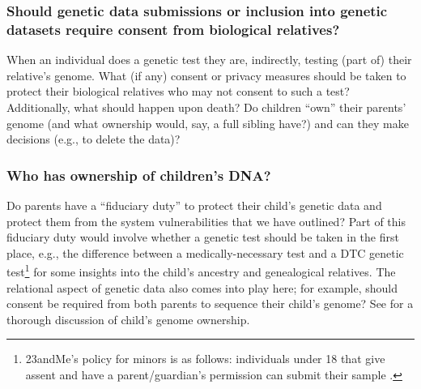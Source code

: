 \subsubsection{Should genetic data submissions or inclusion into genetic datasets require consent from biological relatives?}  %
When an individual does a genetic test they are, indirectly, testing (part of) their relative's genome.  What (if any) consent or privacy measures should be taken to protect their biological relatives who may not consent to such a test? Additionally, what should happen upon death? Do children ``own'' their parents' genome (and what ownership would, say, a full sibling have?) and can they make decisions (e.g., to delete the data)?

\subsubsection{Who has ownership of children’s DNA\@?}
Do parents have a ``fiduciary duty'' to protect their child's genetic data and protect them from the system vulnerabilities that we have outlined? Part of this fiduciary duty would involve whether a genetic test should be taken in the first place, e.g., the difference between a medically-necessary test and a DTC genetic test\footnote{23andMe's policy for minors is as follows: individuals under 18 that give assent and have a parent/guardian's permission can submit their sample \cite{23andme_research_2024}.} for some insights into the child's ancestry and genealogical relatives. 
The relational aspect of genetic data also comes into play here; for example, should consent be required from both parents to sequence their child's genome? See \cite{bala_who_2023} for a thorough discussion of child's genome ownership. 


